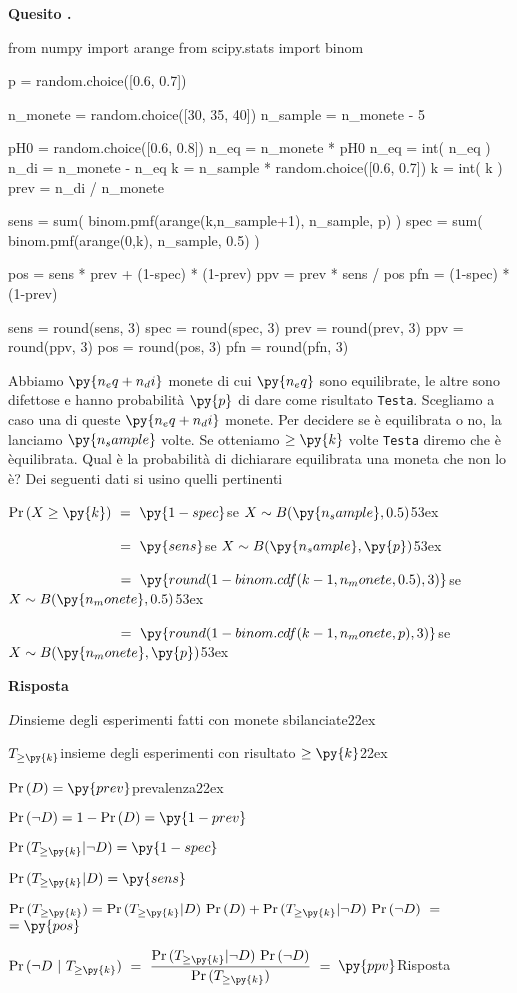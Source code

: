\documentclass[11pt,twoside,a4paper]{article}
\def\Pr{{\rm Pr\,}}
\newcounter{quesito}
\newenvironment{question}{\bigskip\addtocounter{quesito}{1}\par\textbf{Quesito \thequesito.}}{\vspace{\parskip}}
\newenvironment{answer}{\par\textbf{Risposta\quad}}{\vspace{\parskip}}
\begin{document}
\begin{question}
\def\Pr{{\rm Pr\,}}
\begin{pycode}
from numpy import arange
from scipy.stats import binom

p = random.choice([0.6, 0.7])

n_monete = random.choice([30, 35, 40])
n_sample = n_monete - 5

pH0 = random.choice([0.6, 0.8])
n_eq = n_monete * pH0
n_eq = int( n_eq )
n_di = n_monete - n_eq
k = n_sample * random.choice([0.6, 0.7])
k = int( k )
prev = n_di / n_monete


sens = sum( binom.pmf(arange(k,n_sample+1), n_sample, p) )
spec = sum( binom.pmf(arange(0,k), n_sample, 0.5) )

pos =  sens * prev + (1-spec) * (1-prev)
ppv =  prev * sens  / pos
pfn =  (1-spec) * (1-prev) 

sens = round(sens, 3)
spec = round(spec, 3)
prev = round(prev, 3)
ppv = round(ppv, 3)
pos = round(pos, 3)
pfn = round(pfn, 3)
\end{pycode}
Abbiamo $\py{n_eq+n_di}$ monete di cui $\py{n_eq}$ sono equilibrate, le altre sono difettose e hanno probabilità $\py{p}$ di dare come risultato {\tt Testa}. Scegliamo a caso una di queste $\py{n_eq+n_di}$ monete. Per decidere se è equilibrata o no, la lanciamo $\py{n_sample}$ volte. Se otteniamo $\ge\py{k}$ volte {\tt Testa\/} diremo che è èquilibrata. Qual è la probabilità di dichiarare equilibrata una moneta che non lo è? Dei seguenti dati si usino quelli pertinenti


$\Pr(X\ge \py{k})\ =\ \py{1-spec}$\hfill se $X\sim B(\py{n_sample},0.5)$\kern53ex

$\phantom{\Pr(X\ge \py{k})}\ =\ \py{sens}$\hfill se $X\sim B(\py{n_sample},\py{p})$\kern53ex

$\phantom{\Pr(X\ge \py{k})}\ =\ \py{round(1-binom.cdf(k-1, n_monete,0.5), 3)}$\hfill se $X\sim B(\py{n_monete},0.5)$\kern53ex

$\phantom{\Pr(X\ge \py{k})}\ =\ \py{round(1-binom.cdf(k-1, n_monete,  p), 3)}$\hfill se $X\sim B(\py{n_monete},\py{p})$\kern53ex


\begin{answer}

$D$\hfill insieme degli esperimenti fatti con monete sbilanciate\kern22ex

$T_{\ge\py{k}}$\hfill insieme degli esperimenti con risultato $\ge\py{k}$\kern22ex

$\Pr(D)=\py{prev}$\hfill prevalenza\kern22ex

$\Pr(\neg D)=1-\Pr(D)=\py{1-prev}$

$\Pr(T_{\ge\py{k}}| \neg D)=\py{1-spec}$

$\Pr(T_{\ge\py{k}}| D)=\py{sens}$

$\Pr(T_{\ge\py{k}})=\Pr(T_{\ge\py{k}}|D)\ \Pr(D) + \Pr(T_{\ge\py{k}}|\neg D)\ \Pr(\neg D)\ =\kern1ex${\color{blue}$=\py{pos}$}

$\displaystyle\Pr(\neg D ~|~T_{\ge\py{k}})\ =\ \frac{\Pr(T_{\ge\py{k}}|\neg D)\ \Pr(\neg D)}{\Pr(T_{\ge\py{k}})}\ =\kern1ex${\color{blue}$\py{ppv}$\hfill Risposta}

\end{answer}
\end{question}
\end{document}
